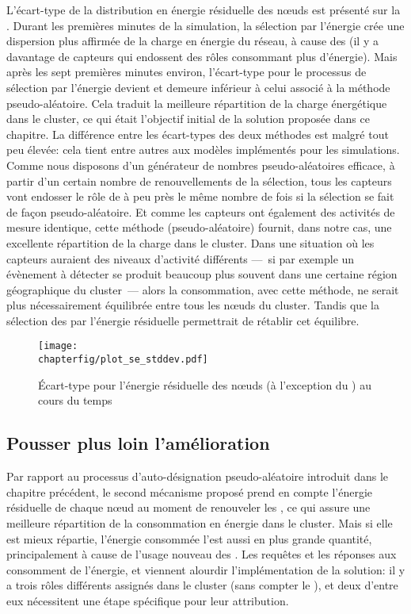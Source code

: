L'écart-type de la distribution en énergie résiduelle des nœuds est présenté sur la .
Durant les premières minutes de la simulation, la sélection par l'énergie crée une dispersion plus affirmée de la charge en énergie du réseau, à cause des \vns (il y a davantage de capteurs qui endossent des rôles consommant plus d'énergie).
Mais après les sept premières minutes environ, l'écart-type pour le processus de sélection par l'énergie devient et demeure inférieur à celui associé à la méthode pseudo-aléatoire.
Cela traduit la meilleure répartition de la charge énergétique dans le cluster, ce qui était l'objectif initial de la solution proposée dans ce chapitre.
La différence entre les écart-types des deux méthodes est malgré tout peu élevée: cela tient entre autres aux modèles implémentés pour les simulations.
Comme nous disposons d'un générateur de nombres pseudo-aléatoires efficace, à partir d'un certain nombre de renouvellements de la sélection, tous les capteurs vont endosser le rôle de \cn à peu près le même nombre de fois si la sélection se fait de façon pseudo-aléatoire.
Et comme les capteurs ont également des activités de mesure identique, cette méthode (pseudo-aléatoire) fournit, dans notre cas, une excellente répartition de la charge dans le cluster.
Dans une situation où les capteurs auraient des niveaux d'activité différents ---~si par exemple un évènement à détecter se produit beaucoup plus souvent dans une certaine région géographique du cluster~--- alors la consommation, avec cette méthode, ne serait plus nécessairement équilibrée entre tous les nœuds du cluster.
Tandis que la sélection des \cns par l'énergie résiduelle permettrait de rétablir cet équilibre.
\begin{figure}[!ht]
    \centering
    \texttt{[image: \\chapterfig/plot\_se\_stddev.pdf]}
    \caption[Écart-type pour l'énergie résiduelle des nœuds au cours du temps]{Écart-type pour l'énergie résiduelle des nœuds (à l'exception du \ch) au cours du temps}\label{se:fig:stddev}
\end{figure}

    \subsection{Pousser plus loin l'amélioration}

Par rapport au processus d'auto-désignation pseudo-aléatoire introduit dans le chapitre précédent, le second mécanisme proposé prend en compte l'énergie résiduelle de chaque nœud au moment de renouveler les \cns, ce qui assure une meilleure répartition de la consommation en énergie dans le cluster.
Mais si elle est mieux répartie, l'énergie consommée l'est aussi en plus grande quantité, principalement à cause de l'usage nouveau des \vns.
Les requêtes et les réponses aux \cns consomment de l'énergie, et viennent alourdir l'implémentation de la solution: il y a trois rôles différents assignés dans le cluster (sans compter le \ch), et deux d'entre eux nécessitent une étape spécifique pour leur attribution.

